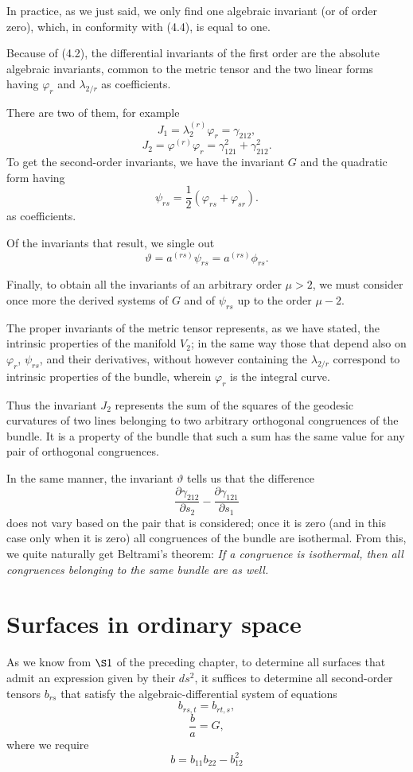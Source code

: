 \documentclass{book}
\begin{document}
In practice, as we just said, we only find one algebraic invariant (or of order zero), which, in conformity with (4.4), is equal to one. 

Because of (4.2), the differential invariants of the first order are the absolute algebraic invariants, common to the metric tensor and the two linear forms having $\varphi_r$ and $\lambda_{2/r}$ as coefficients. 

There are two of them, for example
$$J_1=\lambda_2^{(r)}\varphi_r=\gamma_{212},$$
$$J_2=\varphi^{(r)}\varphi_r=\gamma_{121}^2+\gamma_{212}^2.$$
To get the second-order invariants, we have the invariant $G$ and the quadratic form having
$$\psi_{rs}=\frac{1}{2}(\varphi_{rs}+\varphi_{sr}).$$
as coefficients.

Of the invariants that result, we single out
$$\vartheta=a^{(rs)}\psi_{rs}=a^{(rs)}\phi_{rs}.$$

Finally, to obtain all the invariants of an arbitrary order $\mu>2$, we must consider once more the derived systems of $G$ and of $\psi_{rs}$ up to the order $\mu-2$.

The proper invariants of the metric tensor represents, as we have stated, the intrinsic properties of the manifold $V_2$; in the same way those that depend also on $\varphi_r$, $\psi_{rs}$, and their derivatives, without however containing the $\lambda_{2/r}$ correspond to intrinsic properties of the bundle, wherein $\varphi_r$ is the integral curve.

Thus the invariant $J_2$ represents the sum of the squares of the geodesic curvatures of two lines belonging to two arbitrary orthogonal congruences of the bundle. It is a property of the bundle that such a sum has the same value for any pair of orthogonal congruences. 

In the same manner, the invariant $\vartheta$ tells us that the difference
$$\frac{\partial \gamma_{212}}{\partial s_2}-\frac{\partial \gamma_{121}}{\partial s_1}$$
does not vary based on the pair that is considered; once it is zero (and in this case only when it is zero) all congruences of the bundle are isothermal. From this, we quite naturally get Beltrami's theorem: \emph{If a congruence is isothermal, then all congruences belonging to the same bundle are as well.}

\section{Surfaces in ordinary space}

As we know from $\S1$ of the preceding chapter, to determine all surfaces that admit an expression given by their $ds^2$, it suffices to determine all second-order tensors $b_{rs}$ that satisfy the algebraic-differential system of equations
\begin{equation*}
\tag{c}
b_{rs,t}=b_{rt,s},
\end{equation*}
\begin{equation*}
\tag{g}
\frac{b}{a}=G,
\end{equation*}
where we require
$$b=b_{11}b_{22}-b_{12}^2$$
\end{document}
